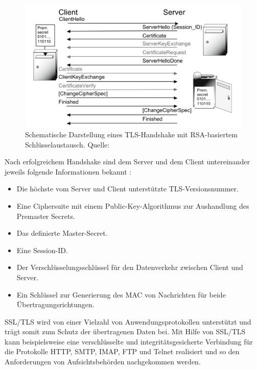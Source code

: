 \begin{figure}[H]
    \centering
  \includegraphics[scale=0.2]{images/uploads/a_figure_09.png}
  \caption{Schematische Darstellung eines TLS-Handshake mit RSA-basiertem Schlüsselaustausch. Quelle: \textcite{SchwenkJörg2020SuKi}}
  \label{fig:best-practice TLS-Handshake}
\end{figure}
\bigbreak
Nach erfolgreichem Handshake sind dem Server und dem Client untereinander jeweils folgende Informationen bekannt \autocite{SchwenkJörg2020SuKi}:
\begin{itemize}
    \item Die höchste vom Server und Client unterstützte TLS-Versionsnummer.
    \item Eine Ciphersuite mit einem Public-Key-Algorithmus zur Aushandlung des Premaster Secrets.
    \item Das definierte Master-Secret.
    \item Eine Session-ID.
    \item Der Verschlüsselungsschlüssel für den Datenverkehr zwischen Client und Server.
    \item Ein Schlüssel zur Generierung des MAC von Nachrichten für beide Übertragungsrichtungen.
\end{itemize}
\bigbreak
SSL/TLS wird von einer Vielzahl von Anwendungsprotokollen unterstützt und trägt somit zum Schutz der übertragenen Daten bei. Mit Hilfe von SSL/TLS kann beispielsweise eine verschlüsselte und integritätsgesicherte Verbindung für die Protokolle \glqq{}HTTP\grqq{}, \glqq{}SMTP\grqq{}, \glqq{}IMAP\grqq{}, \glqq{}FTP\grqq{} und \glqq{}Telnet\grqq{} realisiert und so den Anforderungen von Aufsichtsbehörden nachgekommen werden. \autocite{2022C}

